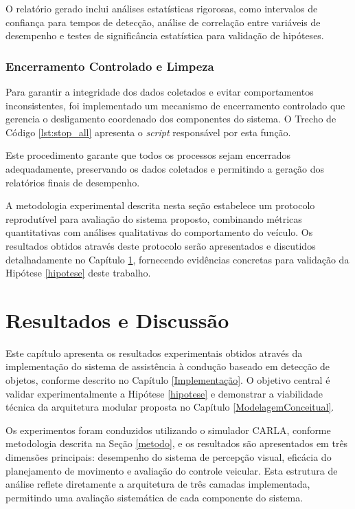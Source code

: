 O relatório gerado inclui análises estatísticas rigorosas, como intervalos de confiança para tempos de detecção, análise de correlação entre variáveis de desempenho e testes de significância estatística para validação de hipóteses.

\subsection{Encerramento Controlado e Limpeza}

Para garantir a integridade dos dados coletados e evitar comportamentos inconsistentes, foi implementado um mecanismo de encerramento controlado que gerencia o desligamento coordenado dos componentes do sistema. O Trecho de Código \ref{lst:stop_all} apresenta o \textit{script} responsável por esta função.

Este procedimento garante que todos os processos sejam encerrados adequadamente, preservando os dados coletados e permitindo a geração dos relatórios finais de desempenho.

A metodologia experimental descrita nesta seção estabelece um protocolo reprodutível para avaliação do sistema proposto, combinando métricas quantitativas com análises qualitativas do comportamento do veículo. Os resultados obtidos através deste protocolo serão apresentados e discutidos detalhadamente no Capítulo \ref{resultados}, fornecendo evidências concretas para validação da Hipótese \ref{hipotese} deste trabalho.

\chapter{Resultados e Discussão} \label{resultados}

Este capítulo apresenta os resultados experimentais obtidos através da implementação do sistema de assistência à condução baseado em detecção de objetos, conforme descrito no Capítulo \ref{Implementação}. O objetivo central é validar experimentalmente a Hipótese \ref{hipotese} e demonstrar a viabilidade técnica da arquitetura modular proposta no Capítulo \ref{ModelagemConceitual}.

Os experimentos foram conduzidos utilizando o simulador CARLA, conforme metodologia descrita na Seção \ref{metodo}, e os resultados são apresentados em três dimensões principais: desempenho do sistema de percepção visual, eficácia do planejamento de movimento e avaliação do controle veicular. Esta estrutura de análise reflete diretamente a arquitetura de três camadas implementada, permitindo uma avaliação sistemática de cada componente do sistema.

